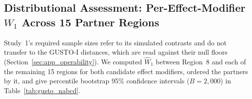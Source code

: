 \documentclass[AMA,Times1COL]{WileyNJDv5}
\begin{document}
\subsection{Distributional Assessment: Per-Effect-Modifier $W_1$ Across 15 Partner Regions}\label{sec:app_nabcd}

Study~1's required sample sizes refer to its simulated contrasts and do not transfer to the GUSTO-I distances, which are read against their null floors (Section~\ref{sec:app_operability}). We computed $\widehat{W}_1$ between Region~8 and each of the remaining 15 regions for both candidate effect modifiers, ordered the partners by it, and give percentile bootstrap 95\% confidence intervals ($B = 2{,}000$) in Table~\ref{tab:gusto_nabcd}.
\end{document}
